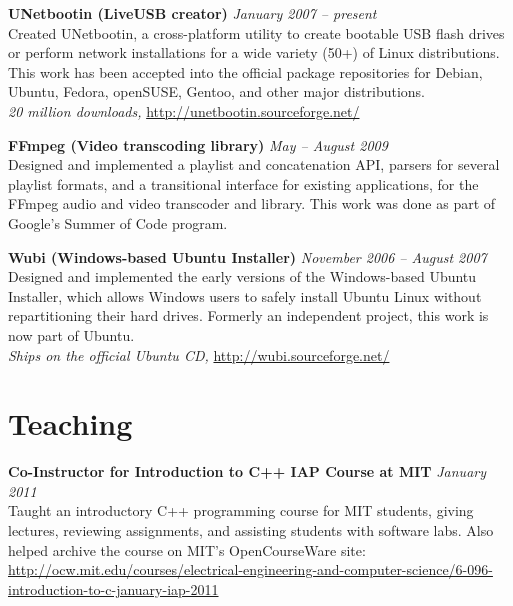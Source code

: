 \documentclass[margin,line]{resume}
\begin{document}
\begin{resume}
\textbf{UNetbootin (LiveUSB creator)} \hfill \textsl{January 2007 -- present}\\
Created UNetbootin, a cross-platform utility to create bootable USB flash drives or perform network installations for a wide variety (50+) of Linux distributions. This work has been accepted into the official package repositories for Debian, Ubuntu, Fedora, openSUSE, Gentoo, and other major distributions. \\
\emph{20 million downloads,} \url{http://unetbootin.sourceforge.net/}

\textbf{FFmpeg (Video transcoding library)} \hfill \textsl{May -- August 2009}\\
Designed and implemented a playlist and concatenation API, parsers for several playlist formats, and a transitional interface for existing applications, for the FFmpeg audio and video transcoder and library. This work was done as part of Google's Summer of Code program.

\textbf{Wubi (Windows-based Ubuntu Installer)} \hfill \textsl{November 2006 -- August 2007}\\
Designed and implemented the early versions of the Windows-based Ubuntu Installer, which allows Windows users to safely install Ubuntu Linux without repartitioning their hard drives. Formerly an independent project, this work is now part of Ubuntu. \\
\emph{Ships on the official Ubuntu CD,} \url{http://wubi.sourceforge.net/}

\section{\mysidestyle Teaching}

\textbf{Co-Instructor for Introduction to C++ IAP Course at MIT} \hfill \textsl{January 2011}\\
Taught an introductory C++ programming course for MIT students, giving lectures, reviewing assignments, and assisting students with software labs. Also helped archive the course on MIT's OpenCourseWare site:\\
\url{http://ocw.mit.edu/courses/electrical-engineering-and-computer-science/6-096-introduction-to-c-january-iap-2011}




\end{resume}
\end{document}
